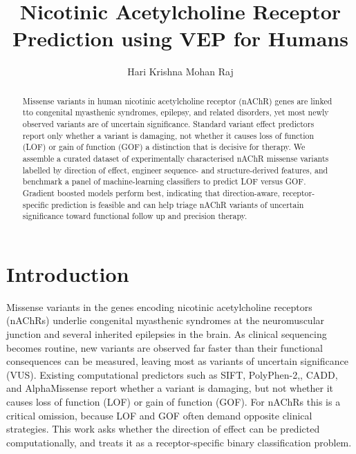 \documentclass{ws-procs11x85}
\begin{document}
\title{Nicotinic Acetylcholine Receptor Prediction using VEP for Humans}

\author{Hari Krishna Mohan Raj}

\address{Department of Computational Chemistry,\\
Hochschule Bonn Rhein Sieg, Sankt Augustin, Germany\\
E-mail: harikrishnam0711@gmail.com}

\begin{abstract}
Missense variants in human nicotinic acetylcholine receptor (nAChR)
genes are linked tto congenital myasthenic syndromes, epilepsy, and
related disorders, yet most newly observed variants are of uncertain
significance. Standard variant effect predictors report only whether a
variant is damaging, not whether it causes loss of function (LOF) or
gain of function (GOF) a distinction that is decisive for therapy. We
assemble a curated dataset of experimentally characterised nAChR
missense variants labelled by direction of effect, engineer sequence-
and structure-derived features, and benchmark a panel of machine-learning
classifiers to predict LOF versus GOF. Gradient boosted models perform
best, indicating that direction-aware, receptor-specific prediction is
feasible and can help triage nAChR variants of uncertain significance
toward functional follow up and precision therapy.
\end{abstract}



\section{Introduction}\label{sec:intro}
Missense variants in the genes encoding nicotinic acetylcholine
receptors (nAChRs) underlie congenital myasthenic syndromes at the
neuromuscular junction and several inherited epilepsies in the brain.
As clinical sequencing becomes routine, new variants are observed far
faster than their functional consequences can be measured, leaving most
as variants of uncertain significance (VUS). Existing computational
predictors such as SIFT, PolyPhen-2,,
CADD, and AlphaMissense report whether a
variant is damaging, but not whether it causes loss of function (LOF) or
gain of function (GOF). For nAChRs this is a critical omission, because
LOF and GOF often demand opposite clinical strategies. This work asks
whether the direction of effect can be predicted computationally, and
treats it as a receptor-specific binary classification problem.
\end{document}
